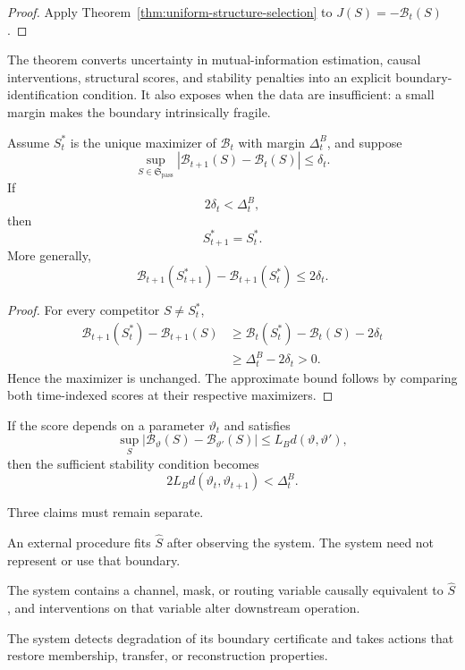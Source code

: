 \begin{proof}
Apply Theorem~\ref{thm:uniform-structure-selection} to
\(J(S)=-\mathcal B_t(S)\).
\end{proof}

The theorem converts uncertainty in mutual-information estimation, causal
interventions, structural scores, and stability penalties into an explicit
boundary-identification condition. It also exposes when the data are
insufficient: a small margin makes the boundary intrinsically fragile.


\begin{theorem}
\label{thm:boundary-drift-stability}
Assume \(S_t^*\) is the unique maximizer of \(\mathcal B_t\) with margin
\(\Delta_t^B\), and suppose
\[
\sup_{S\in\mathfrak S_{\mathrm{pass}}}
|\mathcal B_{t+1}(S)-\mathcal B_t(S)|
\leq\delta_t.
\]
If
\[
2\delta_t<\Delta_t^B,
\]
then
\[
\boxed{S_{t+1}^*=S_t^*.}
\]
More generally,
\[
\mathcal B_{t+1}(S_{t+1}^*)
-
\mathcal B_{t+1}(S_t^*)
\leq2\delta_t.
\]
\end{theorem}

\begin{proof}
For every competitor \(S\neq S_t^*\),
\[
\begin{aligned}
\mathcal B_{t+1}(S_t^*)-
\mathcal B_{t+1}(S)
&\geq
\mathcal B_t(S_t^*)-
\mathcal B_t(S)-2\delta_t\\
&\geq
\Delta_t^B-2\delta_t>0.
\end{aligned}
\]
Hence the maximizer is unchanged. The approximate bound follows by comparing
both time-indexed scores at their respective maximizers.
\end{proof}

If the score depends on a parameter \(\vartheta_t\) and satisfies
\[
\sup_S
|\mathcal B_{\vartheta}(S)-\mathcal B_{\vartheta'}(S)|
\leq
L_Bd(\vartheta,\vartheta'),
\]
then the sufficient stability condition becomes
\[
2L_Bd(\vartheta_t,\vartheta_{t+1})
<
\Delta_t^B.
\]


Three claims must remain separate.

\begin{description}[leftmargin=2.1em,style=nextline]
\item[Analyst-discovered boundary.]
An external procedure fits \(\widehat S\) after observing the system. The
system need not represent or use that boundary.

\item[System-instantiated boundary.]
The system contains a channel, mask, or routing variable causally equivalent to
\(\widehat S\), and interventions on that variable alter downstream operation.

\item[Self-maintained boundary.]
The system detects degradation of its boundary certificate and takes actions
that restore membership, transfer, or reconstruction properties.
\end{description}

